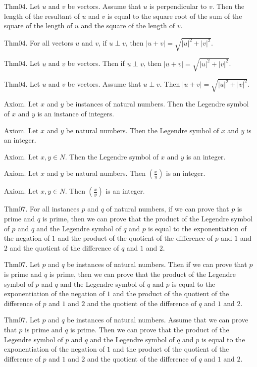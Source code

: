 \documentclass{article}
\begin{document}
Thm04. Let $u$ and $v$ be vectors. Assume that $u$ is perpendicular to $v$. Then the length of the resultant of $u$ and $v$ is equal to the square root of the sum of the square of the length of $u$ and the square of the length of $v$.

Thm04. For all vectors $u$ and $v$, if $u \perp v$, then $| u + v | = \sqrt{ | u | ^{ 2}+ | v | ^{ 2}}$.

Thm04. Let $u$ and $v$ be vectors. Then if $u \perp v$, then $| u + v | = \sqrt{ | u | ^{ 2}+ | v | ^{ 2}}$.

Thm04. Let $u$ and $v$ be vectors. Assume that $u \perp v$. Then $| u + v | = \sqrt{ | u | ^{ 2}+ | v | ^{ 2}}$.

Axiom. Let $x$ and $y$ be instances of natural numbers. Then the Legendre symbol of $x$ and $y$ is an instance of integers.

Axiom. Let $x$ and $y$ be natural numbers. Then the Legendre symbol of $x$ and $y$ is an integer.

Axiom. Let $x , y \in N$. Then the Legendre symbol of $x$ and $y$ is an integer.

Axiom. Let $x$ and $y$ be natural numbers. Then $\left(\frac{ x }{ y }\right)$ is an integer.

Axiom. Let $x , y \in N$. Then $\left(\frac{ x }{ y }\right)$ is an integer.

Thm07. For all instances $p$ and $q$ of natural numbers, if we can prove that $p$ is prime and $q$ is prime, then we can prove that the product of the Legendre symbol of $p$ and $q$ and the Legendre symbol of $q$ and $p$ is equal to the exponentiation of the negation of $1$ and the product of the quotient of the difference of $p$ and $1$ and $2$ and the quotient of the difference of $q$ and $1$ and $2$.

Thm07. Let $p$ and $q$ be instances of natural numbers. Then if we can prove that $p$ is prime and $q$ is prime, then we can prove that the product of the Legendre symbol of $p$ and $q$ and the Legendre symbol of $q$ and $p$ is equal to the exponentiation of the negation of $1$ and the product of the quotient of the difference of $p$ and $1$ and $2$ and the quotient of the difference of $q$ and $1$ and $2$.

Thm07. Let $p$ and $q$ be instances of natural numbers. Assume that we can prove that $p$ is prime and $q$ is prime. Then we can prove that the product of the Legendre symbol of $p$ and $q$ and the Legendre symbol of $q$ and $p$ is equal to the exponentiation of the negation of $1$ and the product of the quotient of the difference of $p$ and $1$ and $2$ and the quotient of the difference of $q$ and $1$ and $2$.
\end{document}
